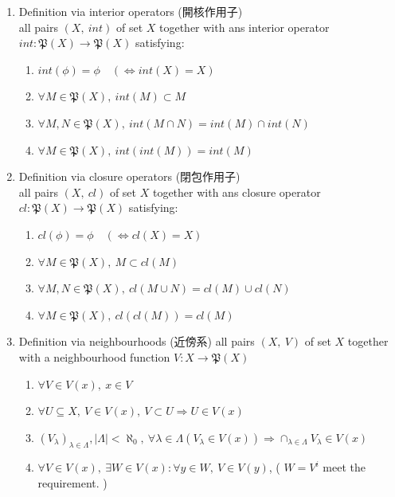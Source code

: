 \documentclass[english,dvipdfmx]{jsarticle}
\begin{document}
\begin{description}
\begin{enumerate}
            \item Definition via interior operators (開核作用子) \\
                all pairs $( X,\ int)$ of set $X$ together with ans interior operator $int : \mathfrak{P}(X) \rightarrow \mathfrak{P}(X)$ satisfying:
                \begin{enumerate}
                    \renewcommand{\labelenumii}{\arabic{enumii}.}
                    \item $int(\phi) = \phi \quad ( \Leftrightarrow int(X) = X )$
                    \item $\forall M \in \mathfrak{P}(X),\ int(M) \subset M$
                    \item $\forall M,N \in \mathfrak{P}(X),\ int(M \cap N) = int(M) \cap int(N)$
                    \item $\forall M \in \mathfrak{P}(X),\ int(int(M)) = int(M)$
                \end{enumerate}
            \item Definition via closure operators (閉包作用子) \\
                all pairs $( X,\ cl)$ of set $X$ together with ans closure operator $cl : \mathfrak{P}(X) \rightarrow \mathfrak{P}(X)$ satisfying:
                \begin{enumerate}
                    \renewcommand{\labelenumii}{\arabic{enumii}.}
                    \item $cl(\phi) = \phi \quad ( \Leftrightarrow cl(X) = X )$
                    \item $\forall M \in \mathfrak{P}(X),\ M \subset cl(M)$
                    \item $\forall M,N \in \mathfrak{P}(X),\ cl(M \cup N) = cl(M) \cup cl(N)$
                    \item $\forall M \in \mathfrak{P}(X),\ cl(cl(M)) = cl(M)$
                \end{enumerate}
            \item Definition via neighbourhoods (近傍系)
                all pairs $( X,\ V)$ of set $X$ together with a neighbourhood function $V : X \rightarrow \mathfrak{P}(X)$
                \begin{enumerate}
                    \renewcommand{\labelenumii}{\arabic{enumii}.}
                    \item $\forall V \in V(x),\ x \in V$
                    \item $\forall U \subseteq X,\ V \in V(x),\ V \subset U \Rightarrow U \in V(x)$
                    \item $(V_{\lambda})_{\lambda \in \Lambda}, |\Lambda| < \aleph_0,\ \forall \lambda \in \Lambda(V_{\lambda} \in V(x)) \Rightarrow \cap_{\lambda \in \Lambda} V_{\lambda} \in V(x)$
                    \item $\forall V \in V(x),\ \exists W \in V(x): \forall y \in W,\ V \in V(y)$, ( $W = V^i$ meet the requirement. )
                \end{enumerate}
        \end{enumerate}
    

\end{description}
\end{document}
